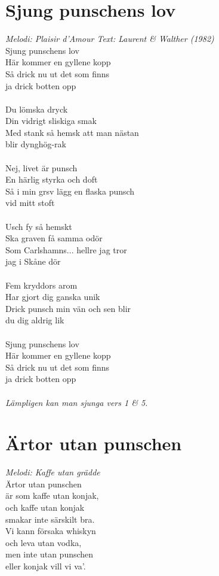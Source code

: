 \section{Sjung punschens lov}
\textit{Melodi: Plaisir d'Amour \hspace{5mm} Text: Laurent \& Walther (1982)}
\vspace{2mm}\\
Sjung punschens lov\\
Här kommer en gyllene kopp\\
Så drick nu ut det som finns\\
ja drick botten opp\\
\\
Du lömska dryck\\
Din vidrigt sliskiga smak\\
Med stank så hemsk att man nästan\\
blir dynghög-rak\\
\\
Nej, livet är punsch\\
En härlig styrka och doft\\
Så i min grsv lägg en flaska punsch\\
vid mitt stoft\\
\\
Usch fy så hemskt\\
Ska graven få samma odör\\
Som Carlshamns... hellre jag tror\\
jag i Skåne dör\\
\\
Fem kryddors arom\\
Har gjort dig ganska unik\\
Drick punsch min vän och sen blir\\
du dig aldrig lik\\
\\
Sjung punschens lov\\
Här kommer en gyllene kopp\\
Så drick nu ut det som finns\\
ja drick botten opp\\
\\
\textit{Lämpligen kan man sjunga vers 1 \& 5.}

\section{Ärtor utan punschen}
\textit{Melodi: Kaffe utan grädde}
\vspace{2mm}\\
Ärtor utan punschen\\
är som kaffe utan konjak,\\
och kaffe utan konjak\\
smakar inte särskilt bra.\\
Vi kann försaka whiskyn\\
och leva utan vodka,\\
men inte utan punschen\\
eller konjak vill vi va'.


